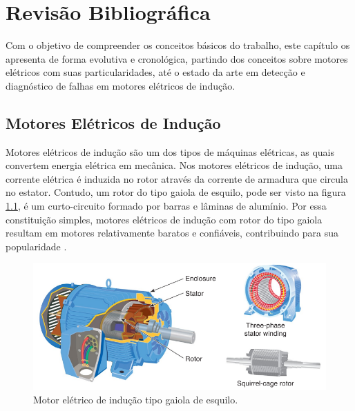 
\chapter{Revisão Bibliográfica}

Com o objetivo de compreender os conceitos básicos do trabalho, este capítulo os apresenta de forma evolutiva e 
cronológica, partindo dos conceitos sobre motores elétricos com suas particularidades, até o estado da arte em 
detecção e diagnóstico de falhas em motores elétricos de indução. 


% 

\section{Motores Elétricos de Indução}\label{sec:}

Motores elétricos de indução são um dos tipos de máquinas elétricas, as quais convertem energia elétrica em mecânica. 
Nos motores elétricos de indução, uma corrente elétrica é induzida no rotor através da corrente de armadura que circula
no estator. Contudo, um rotor do tipo gaiola de esquilo, pode ser visto na figura \ref{fig:ind_motor_petruzella_p115}, 
é um curto-circuito formado por barras e lâminas de alumínio. Por essa constituição simples, motores elétricos de indução
com rotor do tipo gaiola resultam em motores relativamente baratos e confiáveis, contribuindo para sua popularidade \cite{Umans2003}.
 
\begin{figure}[H]
    \caption{Motor elétrico de indução tipo gaiola de esquilo.}
    \begin{center}
        \includegraphics[scale=.5]{referencial/img/ind_motor_petruzella_p115.png}
    \end{center}
    \label{fig:ind_motor_petruzella_p115}
\end{figure}

